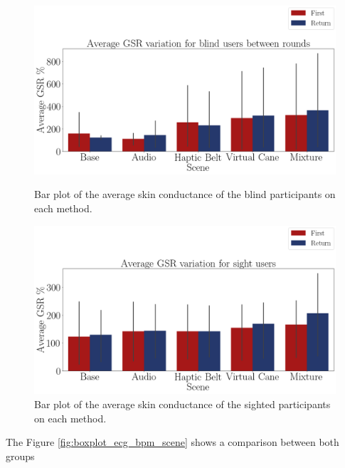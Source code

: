 \begin{figure}[!htb]
    \centering
    \begin{minipage}{\textwidth}
        \centering
        \includegraphics[width = 0.8\linewidth]{Resultados/GSR/Figuras/png/barplot_gsr_scene_blind.png}
        \caption{Bar plot of the average skin conductance of the blind participants on each method.}
        \label{fig:barplot_gsr_scene_blind}
    \end{minipage}
    \begin{minipage}{\textwidth}
        \centering
        \includegraphics[width = 0.8\linewidth]{Resultados/GSR/Figuras/png/barplot_gsr_scene_sight.png}
        \caption{Bar plot of the average skin conductance of the sighted participants on each method.}
        \label{fig:barplot_gsr_scene_sight}
    \end{minipage}
\end{figure}

The Figure \ref{fig:boxplot_ecg_bpm_scene} shows a comparison between both groups

